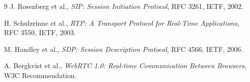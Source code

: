 \documentclass[12pt,a4paper]{article}
\begin{document}
\begin{thebibliography}{9}
J. Rosenberg et al., \textit{SIP: Session Initiation Protocol}, RFC 3261, IETF, 2002.

H. Schulzrinne et al., \textit{RTP: A Transport Protocol for Real-Time Applications}, RFC 3550, IETF, 2003.

M. Handley et al., \textit{SDP: Session Description Protocol}, RFC 4566, IETF, 2006.

A. Bergkvist et al., \textit{WebRTC 1.0: Real-time Communication Between Browsers}, W3C Recommendation.
\end{thebibliography}
\end{document}
